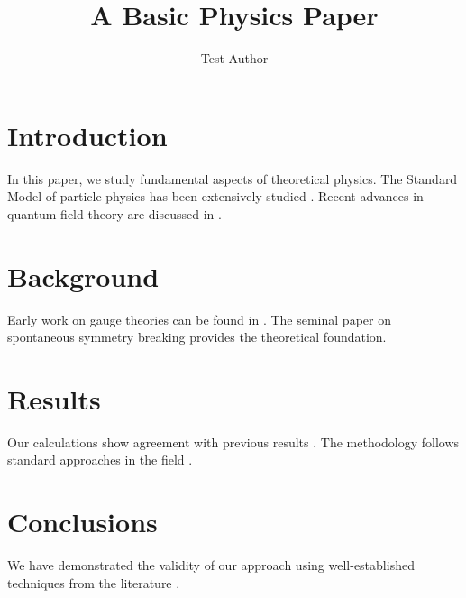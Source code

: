 \documentclass{article}
\title{A Basic Physics Paper}
\author{Test Author}
\date{}
\begin{document}
\maketitle

\section{Introduction}

In this paper, we study fundamental aspects of theoretical physics. The Standard Model of particle physics has been extensively studied \cite{1724847}. Recent advances in quantum field theory are discussed in \cite{2505.23895}.

\section{Background}

Early work on gauge theories can be found in \cite{796859}. The seminal paper on spontaneous symmetry breaking \cite{hep-th/9803103} provides the theoretical foundation.

\section{Results}

Our calculations show agreement with previous results \cite{2301.06999}. The methodology follows standard approaches in the field \cite{1450044}.

\section{Conclusions}

We have demonstrated the validity of our approach using well-established techniques from the literature \cite{2304.02663,1724847}.



\end{document}
